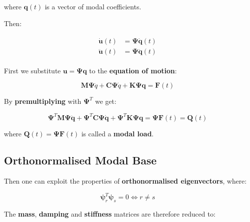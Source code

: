 \documentclass[10pt,b5paper,titlepage]{book}
\newenvironment{eqarray}
{
    \begin{eqnarray}
        \begin{aligned}
}
{
        \end{aligned}
    \end{eqnarray}
}
\begin{document}
where $ \mathbf{q}(t) $ is a vector of modal coefficients.

Then:

\begin{eqarray}
    \dot{\mathbf{u}}(t) &= \mathbf{\Psi} \dot{\mathbf{q}}(t) \\
    \ddot{\mathbf{u}}(t) &= \mathbf{\Psi} \ddot{\mathbf{q}}(t)
\end{eqarray}

First we substitute $ \mathbf{u} = \mathbf{\Psi}\mathbf{q} $ to the
\textbf{equation of motion}:

\begin{equation}
    \mathbf{M} \mathbf{\Psi} \ddot{q} +
    \mathbf{C} \mathbf{\Psi} \dot{q} +
    \mathbf{K}\mathbf{\Psi}\mathbf{q}
    = \mathbf{F}(t)
\end{equation}

By \textbf{premultiplying} with $ \mathbf{\Psi}^T $ we get:

\begin{equation}
    \mathbf{\Psi}^T \mathbf{M} \mathbf{\Psi} \ddot{\mathbf{q}} +
    \mathbf{\Psi}^T \mathbf{C} \mathbf{\Psi} \dot{\mathbf{q}} +
    \mathbf{\Psi}^T \mathbf{K} \mathbf{\Psi} \mathbf{q} =
    \mathbf{\Psi}\mathbf{F}(t) = \mathbf{Q}(t)
\end{equation}

where $ \mathbf{Q}(t) = \mathbf{\Psi} \mathbf{F}(t) $ is called a \textbf{modal load}.

\subsection{Orthonormalised Modal Base}

Then one can exploit the properties of \textbf{orthonormalised eigenvectors}, where:

\begin{equation}
    \mathbf{\psi}_r^T \mathbf{\psi}_s = 0 \Leftrightarrow r \neq s
\end{equation}

The \textbf{mass}, \textbf{damping} and \textbf{stiffness} matrices are therefore
reduced to:
\end{document}
